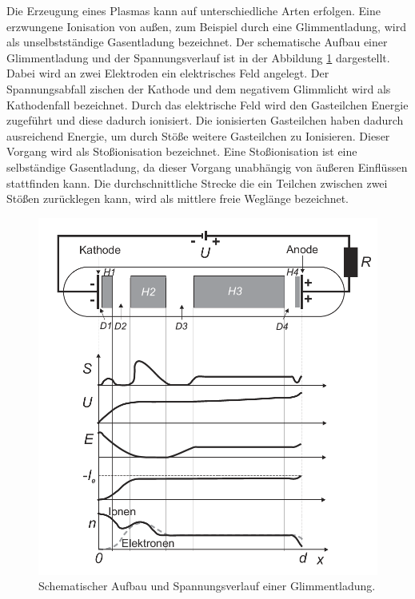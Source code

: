 Die Erzeugung eines Plasmas kann auf unterschiedliche Arten erfolgen. Eine erzwungene Ionisation von außen, zum Beispiel durch eine Glimmentladung, wird als unselbstständige Gasentladung bezeichnet. Der schematische Aufbau einer Glimmentladung und der Spannungsverlauf ist in der Abbildung \ref{fig:Glimmentladung} dargestellt.  Dabei wird an zwei Elektroden ein elektrisches Feld angelegt. Der Spannungsabfall zischen der Kathode und dem negativem Glimmlicht wird als Kathodenfall bezeichnet. Durch das elektrische Feld wird den Gasteilchen Energie zugeführt und diese dadurch ionisiert.  Die ionisierten Gasteilchen haben dadurch ausreichend Energie,  um  durch Stöße weitere Gasteilchen zu  Ionisieren. Dieser Vorgang wird als Stoßionisation bezeichnet. Eine Stoßionisation ist eine selbständige Gasentladung, da dieser Vorgang unabhängig von äußeren Einflüssen stattfinden kann. Die durchschnittliche Strecke die ein Teilchen zwischen zwei Stößen zurücklegen kann, wird als mittlere freie Weglänge bezeichnet. 
\begin{figure}[H]
\centering
\includegraphics[scale=0.4]{Glimmentladung.png}
\caption{Schematischer Aufbau und Spannungsverlauf einer Glimmentladung.\cite{wiki:Glimmentladung}}
\label{fig:Glimmentladung}
\end{figure}

